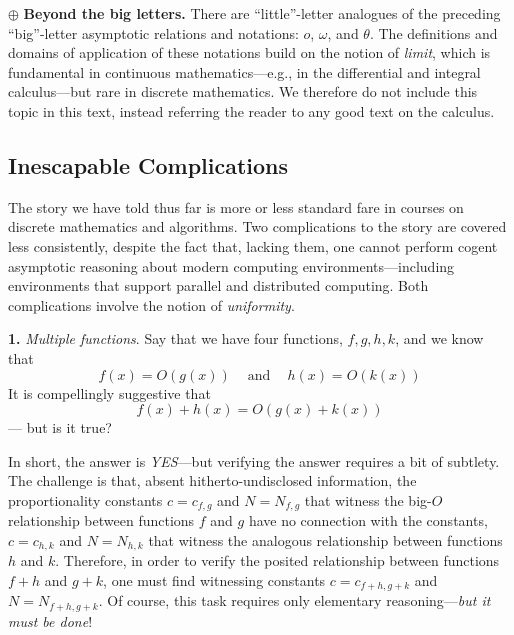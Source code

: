 \noindent $\oplus$ {\bf Beyond the big letters.}
There are ``little''-letter analogues of the preceding ``big''-letter asymptotic relations and notations: $o$, $\omega$, and $\theta$.  The definitions and domains of application of these notations build on the notion of {\it limit}, which is fundamental in continuous mathematics---e.g., in the differential and integral calculus---but rare in discrete mathematics.  We therefore do not include this topic in this text, instead referring the reader to any good text on the calculus.

\subsection{Inescapable Complications}
\label{sec:asymptotic-complication}

The story we have told thus far is more or less standard fare in courses on discrete mathematics and algorithms.  Two complications to the story are covered less consistently, despite the fact that, lacking them, one cannot perform cogent asymptotic reasoning about modern computing
environments---including environments that support parallel and distributed computing.  Both complications involve the notion of {\em uniformity}. 

\medskip

\noindent
{\bf 1.} {\em Multiple functions}.
Say that we have four functions, $f, g, h, k$, and we know that
\[ f(x) = O(g(x)) \ \ \ \  \mbox{ and } \ \ \ \ h(x) = O(k(x)) \]
It is compellingly suggestive that
\[ f(x) + h(x) = O(g(x) + k(x)) \]
--- but is it true?

\smallskip

In short, the answer is {\em YES}---but verifying the answer requires a bit of subtlety.  The challenge is that, absent hitherto-undisclosed information, the proportionality constants $c = c_{f,g}$ and $N = N_{f,g}$ that witness the big-$O$ relationship between functions $f$ and $g$ have no connection with the constants, $c = c_{h,k}$ and $N = N_{h,k}$ that witness the analogous relationship between functions $h$ and $k$.  Therefore, in order to verify the posited relationship between functions $f + h$ and $g + k$, one must find witnessing constants $c = c_{f+h, g+k}$ and $N = N_{f+h,g+k}$.  Of course, this task requires only elementary reasoning---{\em but it must be done}!

\bigskip

